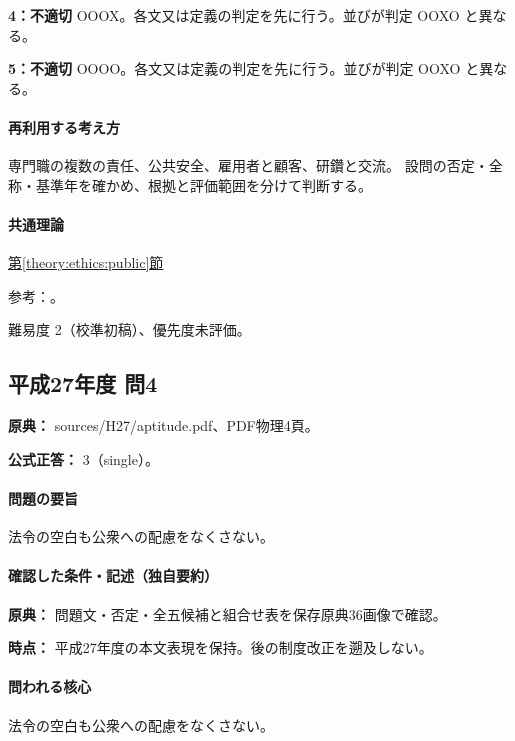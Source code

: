 \noindent\textbf{4：不適切} OOOX。各文又は定義の判定を先に行う。並びが判定 OOXO と異なる。\par

\noindent\textbf{5：不適切} OOOO。各文又は定義の判定を先に行う。並びが判定 OOXO と異なる。\par

\paragraph{再利用する考え方} 専門職の複数の責任、公共安全、雇用者と顧客、研鑽と交流。 設問の否定・全称・基準年を確かめ、根拠と評価範囲を分けて判断する。

\paragraph{共通理論} \hyperref[theory:ethics:public]{第\ref*{theory:ethics:public}節}

\par 参考：\cite{ipej_ethics2011}。

\par 難易度 2（校準初稿）、優先度未評価。

\subsection{平成27年度 問4}
\label{q:h27-reg-apt-04}

\noindent\textbf{原典：} sources/H27/aptitude.pdf、PDF物理4頁。

\textbf{公式正答：} 3（single）。

\paragraph{問題の要旨} 法令の空白も公衆への配慮をなくさない。

\paragraph{確認した条件・記述（独自要約）}\mbox{}\par

\noindent\textbf{原典：} 問題文・否定・全五候補と組合せ表を保存原典36画像で確認。\par

\noindent\textbf{時点：} 平成27年度の本文表現を保持。後の制度改正を遡及しない。\par

\paragraph{問われる核心} 法令の空白も公衆への配慮をなくさない。


